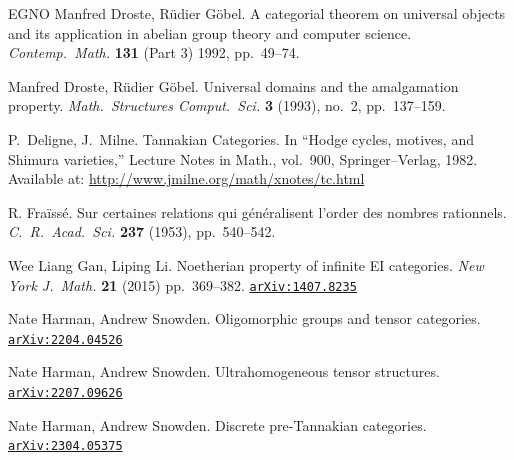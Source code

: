 \documentclass[12pt]{amsart}
\numberwithin{equation}{section}
\theoremstyle{definition}
\newcommand{\arxiv}[1]{\href{http://arxiv.org/abs/#1}{{\tiny\tt arXiv:#1}}}
\newcommand{\DOI}[1]{\href{http://doi.org/#1}{\color{purple}{\tiny\tt DOI:#1}}}
\begin{document}
\begin{thebibliography}{EGNO}
 Manfred Droste, R\"udier G\"obel. A categorial theorem on universal objects and its application in abelian group theory and computer science. \textit{Contemp.\ Math.} \textbf{131} (Part 3) 1992, pp.~49--74. \DOI{10.1090/conm/131.3}

 Manfred Droste, R\"udier G\"obel. Universal domains and the amalgamation property. \textit{Math.\ Structures Comput.\ Sci.} \textbf{3} (1993), no.~2, pp.~137--159. \DOI{10.1017/S0960129500000177}

 P.~Deligne, J.~Milne. Tannakian Categories. In ``Hodge cycles, motives, and Shimura varieties,'' Lecture Notes in Math., vol.\ 900, Springer--Verlag, 1982. \href{http://doi.org/10.1007/978-3-540-38955-2_4}{\color{purple}{\tiny\tt DOI:10.1007/978-3-540-38955-2\_4}}\\
Available at: {\tiny\url{http://www.jmilne.org/math/xnotes/tc.html}}



 R. Fra\"iss\'e. Sur certaines relations qui g\'en\'eralisent l’order des nombres rationnels. \textit{C.~R.~Acad.~Sci.} \textbf{237} (1953), pp.~540--542.


 Wee Liang Gan, Liping Li. Noetherian property of infinite EI categories. \textit{New York J.\ Math.} \textbf{21} (2015) pp.~369--382. \arxiv{1407.8235}

 Nate Harman, Andrew Snowden. Oligomorphic groups and tensor categories. \arxiv{2204.04526}

 Nate Harman, Andrew Snowden. Ultrahomogeneous tensor structures. \arxiv{2207.09626}

 Nate Harman, Andrew Snowden. Discrete pre-Tannakian categories. \arxiv{2304.05375}


\end{thebibliography}
\end{document}
